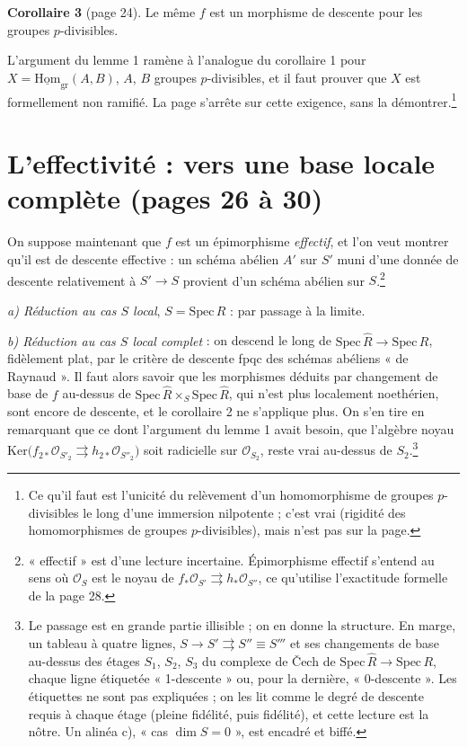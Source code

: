 \documentclass[11pt,a4paper]{article}
\begin{document}
\textbf{Corollaire 3} (page 24). Le même $f$ est un morphisme de descente
pour les groupes $p$-divisibles.

L'argument du lemme 1 ramène à l'analogue du corollaire 1 pour
$X = \underline{\mathrm{Hom}}_{\mathrm{gr}}(A, B)$, $A$, $B$ groupes
$p$-divisibles, et il faut prouver que $X$ est formellement non ramifié. La
page s'arrête sur cette exigence, sans la démontrer.\footnote{Ce qu'il faut
est l'unicité du relèvement d'un homomorphisme de groupes $p$-divisibles le
long d'une immersion nilpotente ; c'est vrai (rigidité des homomorphismes de
groupes $p$-divisibles), mais n'est pas sur la page.}

\section*{L'effectivité : vers une base locale complète (pages 26 à 30)}

On suppose maintenant que $f$ est un épimorphisme \emph{effectif}, et l'on
veut montrer qu'il est de descente effective : un schéma abélien $A'$ sur
$S'$ muni d'une donnée de descente relativement à $S' \to S$ provient d'un
schéma abélien sur $S$.\footnote{« effectif » est d'une lecture incertaine.
Épimorphisme effectif s'entend au sens où $\mathcal{O}_S$ est le noyau de
$f_*\mathcal{O}_{S'} \rightrightarrows h_*\mathcal{O}_{S''}$, ce qu'utilise
l'exactitude formelle de la page 28.}

\emph{a) Réduction au cas $S$ local}, $S = \mathrm{Spec}\,R$ : par passage
à la limite.

\emph{b) Réduction au cas $S$ local complet} : on descend le long de
$\mathrm{Spec}\,\hat R \to \mathrm{Spec}\,R$, fidèlement plat, par le critère
de descente fpqc des schémas abéliens « de Raynaud ». Il faut alors savoir que
les morphismes déduits par changement de base de $f$ au-dessus de
$\mathrm{Spec}\,\hat R \times_S \mathrm{Spec}\,\hat R$, qui n'est plus
localement noethérien, sont encore de descente, et le corollaire 2 ne
s'applique plus. On s'en tire en remarquant que ce dont l'argument du lemme 1
avait besoin, que l'algèbre noyau
$\mathrm{Ker}\bigl(f_{2*}\mathcal{O}_{S'_2} \rightrightarrows
h_{2*}\mathcal{O}_{S''_2}\bigr)$ soit radicielle sur $\mathcal{O}_{S_2}$,
reste vrai au-dessus de $S_2$.\footnote{Le passage est en grande
partie illisible ; on en donne la structure. En marge, un tableau à quatre
lignes, $S \to S' \rightrightarrows S'' \equiv S'''$ et ses changements de
base au-dessus des étages $S_1$, $S_2$, $S_3$ du complexe de Čech de
$\mathrm{Spec}\,\hat R \to \mathrm{Spec}\,R$, chaque ligne étiquetée
« 1-descente » ou, pour la dernière, « 0-descente ». Les étiquettes ne sont
pas expliquées ; on les lit comme le degré de descente requis à chaque étage
(pleine fidélité, puis fidélité), et cette lecture est la nôtre. Un alinéa
c), « cas $\dim S = 0$ », est encadré et biffé.}
\end{document}
